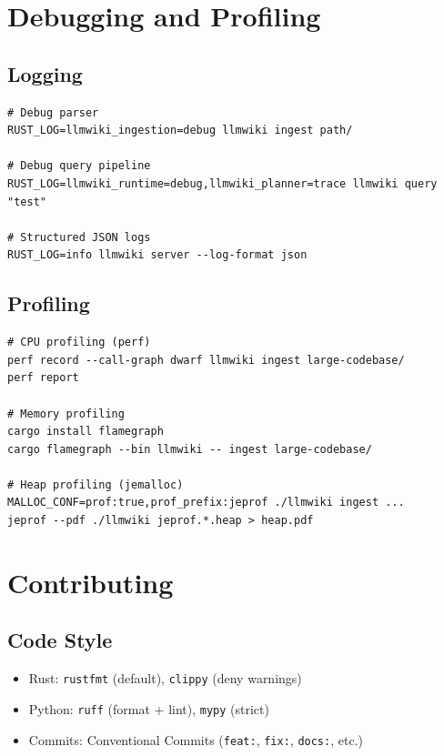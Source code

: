 \section{Debugging and Profiling}
\label{sec:dev:debugging}

\subsection{Logging}
\begin{verbatim}
# Debug parser
RUST_LOG=llmwiki_ingestion=debug llmwiki ingest path/

# Debug query pipeline
RUST_LOG=llmwiki_runtime=debug,llmwiki_planner=trace llmwiki query "test"

# Structured JSON logs
RUST_LOG=info llmwiki server --log-format json
\end{verbatim}

\subsection{Profiling}
\begin{verbatim}
# CPU profiling (perf)
perf record --call-graph dwarf llmwiki ingest large-codebase/
perf report

# Memory profiling
cargo install flamegraph
cargo flamegraph --bin llmwiki -- ingest large-codebase/

# Heap profiling (jemalloc)
MALLOC_CONF=prof:true,prof_prefix:jeprof ./llmwiki ingest ...
jeprof --pdf ./llmwiki jeprof.*.heap > heap.pdf
\end{verbatim}

\section{Contributing}
\label{sec:dev:contributing}

\subsection{Code Style}
\begin{itemize}
  \item Rust: \texttt{rustfmt} (default), \texttt{clippy} (deny warnings)
  \item Python: \texttt{ruff} (format + lint), \texttt{mypy} (strict)
  \item Commits: Conventional Commits (\texttt{feat:}, \texttt{fix:}, \texttt{docs:}, etc.)
\end{itemize}

